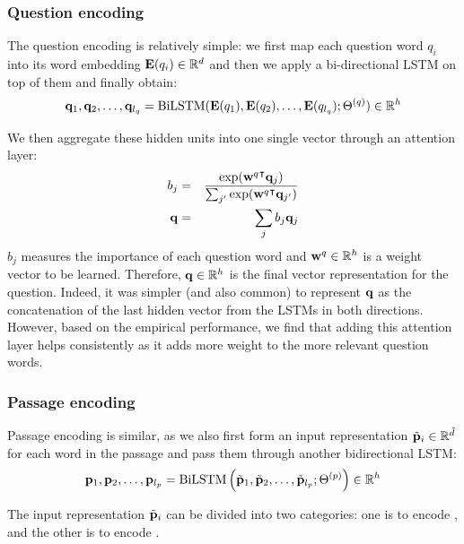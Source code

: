 \subsubsection*{Question encoding}
\label{sec:question-encoding}
The question encoding is relatively simple: we first map each question word $q_i$ into its word embedding $\mathbf{E}(q_i) \in \mathbb{R}^d$ and then we apply a bi-directional LSTM on top of them and finally obtain:
\begin{equation}
    \mathbf{q}_{1}, \mathbf{q}_2, \ldots, \mathbf{q}_{l_q} = \text{BiLSTM}(\mathbf{E}(q_1), \mathbf{E}(q_2), \ldots, \mathbf{E}(q_{l_q}); \Theta^{(q)}) \in \mathbb{R}^{h}
\end{equation}

We then aggregate these hidden units into one single vector through an attention layer:
\begin{eqnarray}
    b_j & = & \frac{\exp({\mathbf{w}^{q}}^\intercal \mathbf{q}_j)}{\sum_{j'}{\exp({\mathbf{w}^{q}}^\intercal \mathbf{q}_{j'})}} \\
    \mathbf{q} & = & \sum_j{b_j \mathbf{q}_j}
\end{eqnarray}
$b_j$ measures the importance of each question word and $\mathbf{w}^{q} \in \mathbb{R}^h$ is a weight vector to be learned. Therefore, $\mathbf{q} \in \mathbb{R}^h$ is the final vector representation for the question. Indeed, it was simpler (and also common) to represent $\mathbf{q}$ as the concatenation of the last hidden vector from the LSTMs in both directions. However, based on the empirical performance, we find that adding this attention layer helps consistently as it adds more weight to the more relevant question words.

\subsubsection*{Passage encoding}
Passage encoding is similar, as we also first form an input representation $\tilde{\mathbf{p}}_i \in \mathbb{R}^{\tilde{d}}$ for each word in the passage and pass them through another bidirectional LSTM:
\begin{equation}
  \label{eq:passage-lstm}
    \mathbf{p}_{1}, \mathbf{p}_2, \ldots, \mathbf{p}_{l_p} = \text{BiLSTM}\left(\tilde{\mathbf{p}}_1, \tilde{\mathbf{p}}_2, \ldots, \tilde{\mathbf{p}}_{l_p}; \Theta^{(p)}\right) \in \mathbb{R}^{h}
\end{equation}

The input representation $\tilde{\mathbf{p}}_i$ can be divided into two categories: one is to encode , and the other is to encode .

